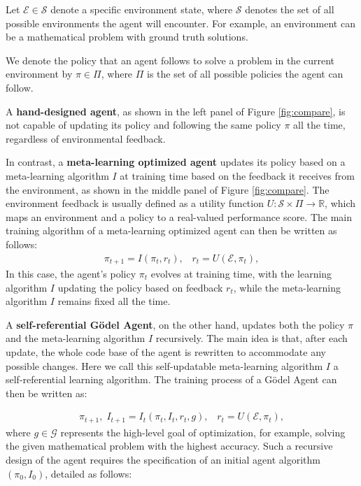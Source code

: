 \documentclass[11pt]{article}
\newcommand{\framework}{Gödel Agent\xspace}
\begin{document}
Let $\mathcal{E} \in \mathcal{S}$ denote a specific environment state, where $\mathcal{S}$ denotes the set of all possible environments the agent will encounter. For example, an environment can be a mathematical problem with ground truth solutions.

We denote the policy that an agent follows to solve a problem in the current environment by $\pi \in \Pi$, where $\Pi$ is the set of all possible policies the agent can follow. 


A \textbf{hand-designed agent}, as shown in the left panel of Figure \ref{fig:compare}, is not capable of updating its policy and following the same policy $\pi$ all the time, regardless of environmental feedback.

In contrast, a \textbf{meta-learning optimized agent} updates its policy based on a meta-learning algorithm $I$ at training time based on the feedback it receives from the environment, as shown in the middle panel of Figure \ref{fig:compare}. The environment feedback is usually defined as a utility function $U: \mathcal{S} \times \Pi \rightarrow \mathbb{R}$, which maps an environment and a policy to a real-valued performance score. The main training algorithm of a meta-learning optimized agent can then be written as follows:
\begin{align*}
    \pi_{t+1} = I(\pi_t, r_t),\;\;\; r_t = U(\mathcal{E}, \pi_t),
\end{align*}
In this case, the agent's policy $\pi_t$ evolves at training time, with the learning algorithm $I$ updating the policy based on feedback $r_t$, while the meta-learning algorithm $I$ remains fixed all the time.



A \textbf{self-referential \framework}, on the other hand, updates both the policy $\pi$ and the meta-learning algorithm $I$ recursively. The main idea is that, after each update, the whole code base of the agent is rewritten to accommodate any possible changes. Here we call this self-updatable meta-learning algorithm $I$ a self-referential learning algorithm. The training process of a \framework can then be written as:





\begin{align*}
    \pi_{t+1}, \; I_{t+1} = I_t(\pi_t, I_t, r_t, g),\;\;\; r_t = U(\mathcal{E}, \pi_t),
\end{align*}
where $g \in \mathcal{G}$ represents the high-level goal of optimization, for example, solving the given mathematical problem with the highest accuracy. Such a recursive design of the agent requires the specification of an initial agent algorithm $(\pi_0, I_0)$, detailed as follows:
\end{document}
